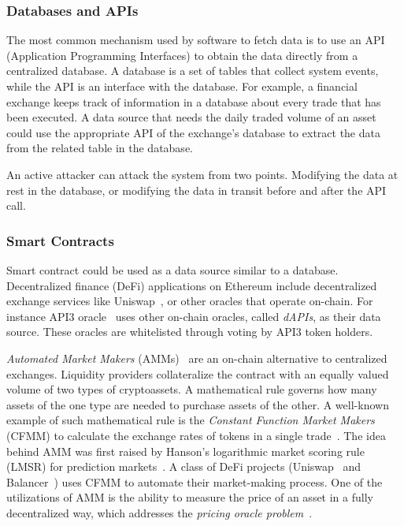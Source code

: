 \subsubsection{Databases and APIs} 

The most common mechanism used by software to fetch data is to use an API (Application Programming Interfaces) to obtain the data directly from a centralized database. A database is a set of tables that collect system events, while the API is an interface with the database. For example, a financial exchange keeps track of information in a database about every trade that has been executed. A data source that needs the daily traded volume of an asset could use the appropriate API of the exchange's database to extract the data from the related table in the database.

An active attacker can attack the system from two points. Modifying the data at rest in the database, or modifying the data in transit before and after the API call. 

\subsubsection{Smart Contracts}

Smart contract could be used as a data source similar to a database. Decentralized finance (DeFi) applications on Ethereum include decentralized exchange services like Uniswap~\cite{adams2019uniswap}, or other oracles that operate on-chain. For instance API3 oracle~\cite{benligiraydecentralized} uses other on-chain oracles, called \textit{dAPIs}, as their data source. These oracles are whitelisted through voting by API3 token holders.

\textit{Automated Market Makers} (AMMs)~\cite{wang2020automated} are an on-chain alternative to centralized exchanges. Liquidity providers collateralize the contract with an equally valued volume of two types of cryptoassets. A mathematical rule governs how many assets of the one type are needed to purchase assets of the other. A well-known example of such mathematical rule is the \textit{Constant Function Market Makers} (CFMM) to calculate the exchange rates of tokens in a single trade~\cite{uniswapexplained}. The idea behind AMM was first raised by Hanson's logarithmic market scoring rule (LMSR) for prediction markets~\cite{hanson2003combinatorial}. A class of DeFi projects (\eg Uniswap~\cite{adams2019uniswap,adams2021uniswap} and Balancer~\cite{balancer}) uses CFMM to automate their market-making process. One of the utilizations of AMM is the ability to measure the price of an asset in a fully decentralized way, which addresses the \textit{pricing oracle problem}~\cite{angeris2020improved}.


